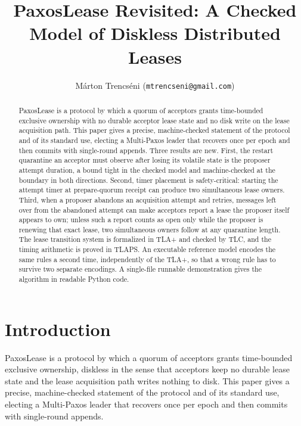 \documentclass[final,5p,times,twocolumn,number]{elsarticle}
\newcommand{\code}[1]{\texttt{#1}}
\begin{document}
\begin{frontmatter}

\title{PaxosLease Revisited: A Checked Model of Diskless Distributed Leases}

\author{M\'arton Trencs\'eni (\code{mtrencseni@gmail.com})}

\begin{abstract}
PaxosLease is a protocol by which a quorum of acceptors grants time-bounded exclusive ownership with no durable acceptor lease state and no disk write on the lease acquisition path.  This paper gives a precise, machine-checked statement of the protocol and of its standard use, electing a Multi-Paxos leader that recovers once per epoch and then commits with single-round appends.  Three results are new.  First, the restart quarantine an acceptor must observe after losing its volatile state is the proposer attempt duration, a bound tight in the checked model and machine-checked at the boundary in both directions.  Second, timer placement is safety-critical: starting the attempt timer at prepare-quorum receipt can produce two simultaneous lease owners.  Third, when a proposer abandons an acquisition attempt and retries, messages left over from the abandoned attempt can make acceptors report a lease the proposer itself appears to own; unless such a report counts as open only while the proposer is renewing that exact lease, two simultaneous owners follow at any quarantine length.  The lease transition system is formalized in TLA+ and checked by TLC, and the timing arithmetic is proved in TLAPS.  An executable reference model encodes the same rules a second time, independently of the TLA+, so that a wrong rule has to survive two separate encodings.  A single-file runnable demonstration gives the algorithm in readable Python code.
\end{abstract}

\end{frontmatter}

\section{Introduction}\label{sec:intro}

PaxosLease \cite{ref1} is a protocol by which a quorum of acceptors grants time-bounded exclusive ownership, diskless in the sense that acceptors keep no durable lease state and the lease acquisition path writes nothing to disk.  This paper gives a precise, machine-checked statement of the protocol and of its standard use, electing a Multi-Paxos leader that recovers once per epoch and then commits with single-round appends.
\end{document}
